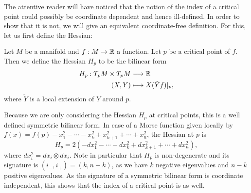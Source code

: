 The attentive reader will have noticed that the notion of the index of a critical point could possibly be coordinate dependent and hence ill-defined.
In order to show that it is not, we will give an equivalent coordinate-free definition.
For this, let us first define the Hessian:
\begin{definition}[Hessian]
    Let $M$ be a manifold and $f: M \to  \mathbb{R}$ a function.
    Let $p$ be a critical point of $f$.
    Then we define the Hessian $H_p$ to be the bilinear form
    \begin{align*}
        H_p: T_pM \times T_pM &\longrightarrow  \mathbb{R}\\
        (X, Y) &\longmapsto X (\tilde{Y} f)|_p
    ,\end{align*} 
    where $\tilde{Y}$ is a local extension of $Y$ around $p$.
\end{definition}
Because we are only considering the Hessian $H_p$ at critical points, this is a well defined symmetric bilinear form. 
In case of a Morse function given locally by $f(x) = f(p) - x_1^2 - \cdots - x_k^2 + x_{k+1}^2 + \cdots + x_n^2$, the Hessian at $p$ is 
\[
    H_p = 2(- dx_1^2 - \cdots - dx_k^2 + dx_{k+1}^2  + \cdots + dx_n^2)
,\] 
where $dx_i^2 = dx_i \otimes dx_i$.
Note in particular that $H_p$ is non-degenerate and its signature is $(i_-, i_{+}) = (k, n-k)$, as we have $k$ negative eigenvalues and $n-k$ positive eigenvalues.
As the signature of a symmetric bilinear form is coordinate independent, this shows that the index of a critical point is as well.



